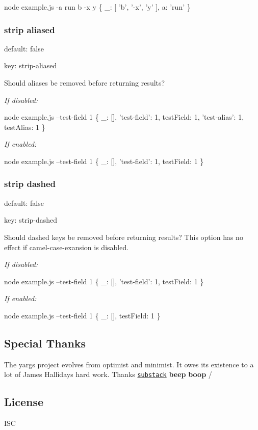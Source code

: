 \begin{DoxyCode}
node example.js -a run b -x y
\{ \_: [ 'b', '-x', 'y' ], a: 'run' \}
\end{DoxyCode}


\subsubsection*{strip aliased}


\begin{DoxyItemize}
\item default\+: {\ttfamily false}
\item key\+: {\ttfamily strip-\/aliased}
\end{DoxyItemize}

Should aliases be removed before returning results?

{\itshape If disabled\+:}


\begin{DoxyCode}
node example.js --test-field 1
\{ \_: [], 'test-field': 1, testField: 1, 'test-alias': 1, testAlias: 1 \}
\end{DoxyCode}


{\itshape If enabled\+:}


\begin{DoxyCode}
node example.js --test-field 1
\{ \_: [], 'test-field': 1, testField: 1 \}
\end{DoxyCode}


\subsubsection*{strip dashed}


\begin{DoxyItemize}
\item default\+: {\ttfamily false}
\item key\+: {\ttfamily strip-\/dashed}
\end{DoxyItemize}

Should dashed keys be removed before returning results? This option has no effect if {\ttfamily camel-\/case-\/exansion} is disabled.

{\itshape If disabled\+:}


\begin{DoxyCode}
node example.js --test-field 1
\{ \_: [], 'test-field': 1, testField: 1 \}
\end{DoxyCode}


{\itshape If enabled\+:}


\begin{DoxyCode}
node example.js --test-field 1
\{ \_: [], testField: 1 \}
\end{DoxyCode}


\subsection*{Special Thanks}

The yargs project evolves from optimist and minimist. It owes its existence to a lot of James Halliday\textquotesingle{}s hard work. Thanks \href{https://github.com/substack}{\tt substack} {\bfseries beep} {\bfseries boop} /

\subsection*{License}

I\+SC 